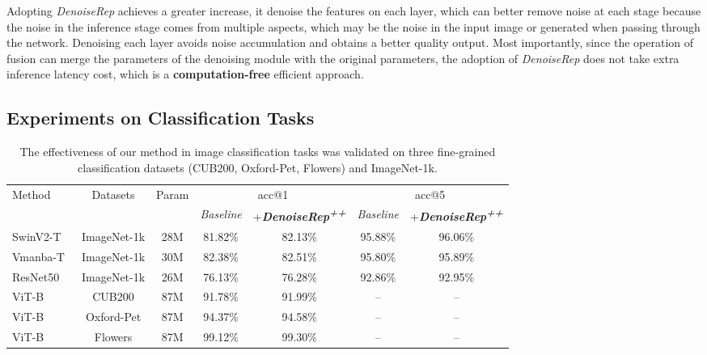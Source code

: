 \documentclass[conference]{IEEEtran}
\begin{document}
{Adopting \textit{DenoiseRep} achieves a greater increase, it denoise the features on each layer, which can better remove noise at each stage because the noise in the inference stage comes from multiple aspects, which may be the noise in the input image or generated when passing through the network. Denoising each layer avoids noise accumulation and obtains a better quality output. Most importantly, since the operation of fusion can merge the parameters of the denoising module with the original parameters, the adoption of \textit{DenoiseRep} does not take extra inference latency cost, which is a \textbf{computation-free} efficient approach.


\subsection{Experiments on Classification Tasks}

\begin{table}[ht!]
\centering
\caption{The effectiveness of our method in image classification tasks was validated on three fine-grained classification datasets (CUB200, Oxford-Pet, Flowers) and ImageNet-1k.}
\label{tab: Large-Scale Image Classification}
\vspace{0.2cm}
\renewcommand{\arraystretch}{1.2} %
\begin{tabular}{l|c|c|cc|cc}
\hline \hline
\multirow{2}{*}{Method} & 
\multirow{2}{*}{Datasets} & 
\multirow{2}{*}{Param} & 
\multicolumn{2}{c|}{acc@1} & 
\multicolumn{2}{c}{acc@5} \\
 & & & \textit{Baseline} & +\textit{\textbf{DenoiseRep\textsuperscript{++}}} & \textit{Baseline} & +\textit{\textbf{DenoiseRep\textsuperscript{++}}} \\
\hline
SwinV2-T~\cite{liu2021swin} & ImageNet-1k & 28M & 81.82\% & 82.13\% & 95.88\% & 96.06\% \\
Vmanba-T~\cite{liu2024vmamba} & ImageNet-1k & 30M & 82.38\% & 82.51\% & 95.80\% & 95.89\% \\
ResNet50~\cite{he2016deep} & ImageNet-1k & 26M & 76.13\% & 76.28\% & 92.86\% & 92.95\% \\
\hline
ViT-B~\cite{dosovitskiy2020image} & CUB200 & 87M & 91.78\% & 91.99\% & -- & -- \\
ViT-B & Oxford-Pet & 87M & 94.37\% & 94.58\% & -- & -- \\
ViT-B & Flowers & 87M & 99.12\% & 99.30\% & -- & -- \\
\hline \hline
\end{tabular}
\end{table}

}
\end{document}

